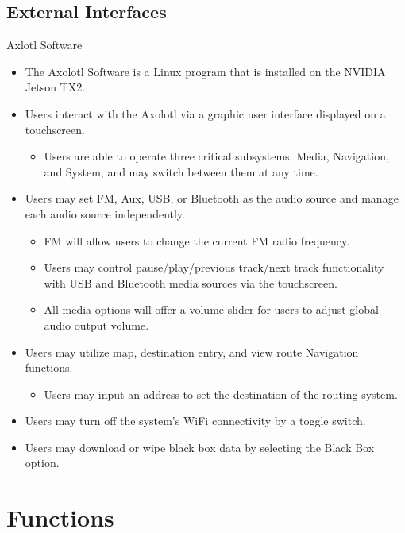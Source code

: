 \documentclass[onecolumn, draftclsnofoot,10pt, compsoc]{IEEEtran}
\begin{document}
\subsection{External Interfaces}
Axlotl Software
\begin{itemize}
	\item The Axolotl Software is a Linux program that is installed on the NVIDIA Jetson TX2.
	\item Users interact with the Axolotl via a graphic user interface displayed on a touchscreen.
	\begin{itemize}
		\item Users are able to operate three critical subsystems: Media, Navigation, and System, and may switch between them at any time.
	\end{itemize}
	\item Users may set FM, Aux, USB, or Bluetooth as the audio source and manage each audio source independently.
	\begin{itemize}
		\item FM will allow users to change the current FM radio frequency.
		\item Users may control pause/play/previous track/next track functionality with USB and Bluetooth media sources via the touchscreen.
		\item All media options will offer a volume slider for users to adjust global audio output volume.
	\end{itemize}
	\item Users may utilize map, destination entry, and view route Navigation functions.
	\begin{itemize}
		\item Users may input an address to set the destination of the routing system.
	\end{itemize}
	\item Users may turn off the system's WiFi connectivity by a toggle switch.
	\item Users may download or wipe black box data by selecting the Black Box option.
\end{itemize}
\section{Functions}
\end{document}
